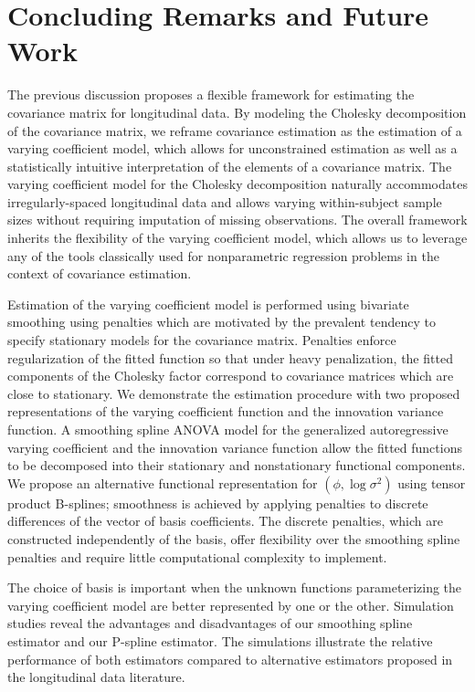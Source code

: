 
\chapter{Concluding Remarks and Future Work}\label{concluding-remarks-chapter}




The previous discussion proposes a flexible framework for estimating the covariance matrix for longitudinal data. By modeling the Cholesky decomposition of the covariance matrix, we reframe covariance estimation as the estimation of a varying coefficient model, which allows for unconstrained estimation as well as a statistically intuitive interpretation of the elements of a covariance matrix. The varying coefficient model for the Cholesky decomposition naturally accommodates irregularly-spaced longitudinal data and allows varying within-subject sample sizes without requiring imputation of missing observations. The overall framework inherits the flexibility of the varying coefficient model, which allows us to leverage any of the tools classically used for nonparametric regression problems in the context of covariance estimation.

\bigskip

Estimation of the varying coefficient model is performed using bivariate smoothing using penalties which are motivated by the prevalent tendency to specify stationary models for the covariance matrix. Penalties enforce regularization of the fitted function so that under heavy penalization, the fitted components of the Cholesky factor correspond to covariance matrices which are close to stationary. We demonstrate the estimation procedure with two proposed representations of the varying coefficient function and the innovation variance function. A smoothing spline ANOVA model for the generalized autoregressive varying coefficient and the innovation variance function allow the fitted functions to be decomposed into their stationary and nonstationary functional components. We propose an alternative functional representation for $\left(\phi, \log\sigma^2\right)$ using tensor product B-splines; smoothness is achieved by applying penalties to discrete differences of the vector of basis coefficients. The discrete penalties, which are constructed independently of the basis, offer flexibility over the smoothing spline penalties and require little computational complexity to implement. 

\bigskip
The choice of basis is important when the unknown functions parameterizing the varying coefficient model are better represented by one or the other. Simulation studies reveal the advantages and disadvantages of our smoothing spline estimator and our P-spline estimator. The simulations illustrate the relative performance of both estimators compared to alternative estimators proposed in the longitudinal data literature. 

